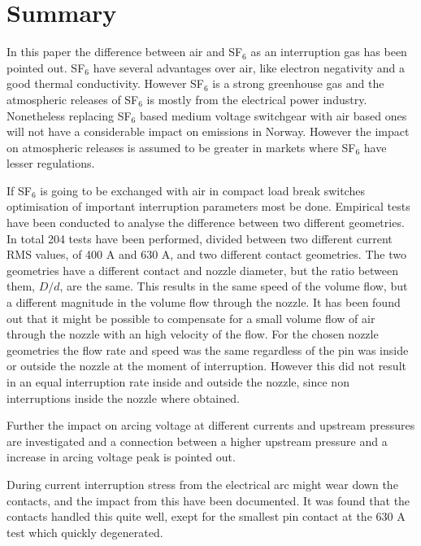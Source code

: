 \documentclass[10pt,a4paper,twoside]{article}
\begin{document}
\thispagestyle{empty}
\cleardoublepage

\section*{Summary}
\setcounter{page}{1}

In this paper the difference between air and SF$_6$ as an interruption gas has been pointed out. SF$_6$ have several advantages over air, like electron negativity and a good thermal conductivity. However SF$_6$ is a strong greenhouse gas and the atmospheric releases of SF$_6$ is mostly from the electrical power industry. Nonetheless replacing SF$_6$ based medium voltage switchgear with air based ones will not have a considerable impact on emissions in Norway. However the impact on atmospheric releases is assumed to be greater in markets where SF$_6$ have lesser regulations.

If SF$_6$ is going to be exchanged with air in compact load break switches optimisation of important interruption parameters most be done. Empirical tests have been conducted to analyse the difference between two different geometries. In total 204 tests have been performed, divided between two different current RMS values, of 400 A and 630 A, and two different contact geometries. The two geometries have a different contact and nozzle diameter, but the ratio between them, $D/d$, are the same. This results in the same speed of the volume flow, but a different magnitude in the volume flow through the nozzle. It has been found out that it might be possible to compensate for a small volume flow of air through the nozzle with an high velocity of the flow. For the chosen nozzle geometries the flow rate and speed was the same regardless of the pin was inside or outside the nozzle at the moment of interruption. However this did not result in an equal interruption rate inside and outside the nozzle, since non interruptions inside the nozzle where obtained.

Further the impact on arcing voltage at different currents and upstream pressures are investigated and a connection between a higher upstream pressure and a increase in arcing voltage peak is pointed out.

During current interruption stress from the electrical arc might wear down the contacts, and the impact from this have been documented. It was found that the contacts handled this quite well, exept for the smallest pin contact at the 630 A test which quickly degenerated.
\end{document}
